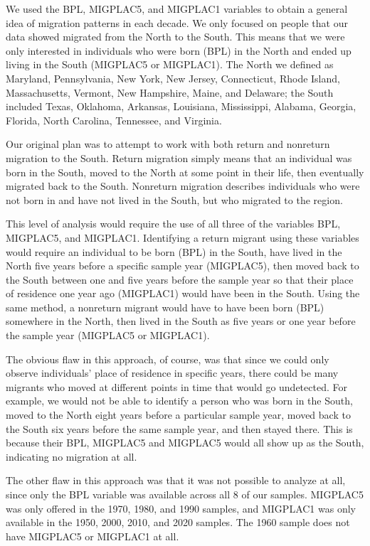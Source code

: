 \documentclass[12pt]{article}
\begin{document}
We used the BPL, MIGPLAC5, and MIGPLAC1 variables to obtain a general idea of migration patterns in each decade. We only focused on people that our data showed migrated from the North to the South. This means that we were only interested in individuals who were born (BPL) in the North and ended up living in the South (MIGPLAC5 or MIGPLAC1). The North we defined as Maryland, Pennsylvania, New York, New Jersey, Connecticut, Rhode Island, Massachusetts, Vermont, New Hampshire, Maine, and Delaware; the South included Texas, Oklahoma, Arkansas, Louisiana, Mississippi, Alabama, Georgia, Florida, North Carolina, Tennessee, and Virginia. 

Our original plan was to attempt to work with both return and nonreturn migration to the South. Return migration simply means that an individual was born in the South, moved to the North at some point in their life, then eventually migrated back to the South. Nonreturn migration describes individuals who were not born in and have not lived in the South, but who migrated to the region. 

This level of analysis would require the use of all three of the variables BPL, MIGPLAC5, and MIGPLAC1. Identifying a return migrant using these variables would require an individual to be born (BPL) in the South, have lived in the North five years before a specific sample year (MIGPLAC5), then moved back to the South between one and five years before the sample year so that their place of residence one year ago (MIGPLAC1) would have been in the South. Using the same method, a nonreturn migrant would have to have been born (BPL) somewhere in the North, then lived in the South as five years or one year before the sample year (MIGPLAC5 or MIGPLAC1). 

The obvious flaw in this approach, of course, was that since we could only observe individuals’ place of residence in specific years, there could be many migrants who moved at different points in time that would go undetected. For example, we would not be able to identify a person who was born in the South, moved to the North eight years before a particular sample year, moved back to the South six years before the same sample year, and then stayed there. This is because their BPL, MIGPLAC5 and MIGPLAC5 would all show up as the South, indicating no migration at all. 

The other flaw in this approach was that it was not possible to analyze at all, since only the BPL variable was available across all 8 of our samples. MIGPLAC5 was only offered in the 1970, 1980, and 1990 samples, and MIGPLAC1 was only available in the 1950, 2000, 2010, and 2020 samples. The 1960 sample does not have MIGPLAC5 or MIGPLAC1 at all. 
\end{document}
